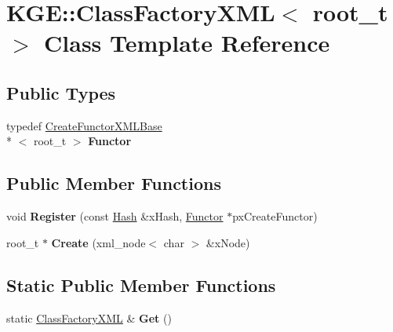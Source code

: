 \hypertarget{class_k_g_e_1_1_class_factory_x_m_l}{\section{K\-G\-E\-:\-:Class\-Factory\-X\-M\-L$<$ root\-\_\-t $>$ Class Template Reference}
\label{class_k_g_e_1_1_class_factory_x_m_l}
}
\subsection*{Public Types}
\begin{DoxyCompactItemize}
\item 
\hypertarget{class_k_g_e_1_1_class_factory_x_m_l_ae739bb8562789f755b760b7a6241c258}{typedef \hyperlink{class_k_g_e_1_1_create_functor_x_m_l_base}{Create\-Functor\-X\-M\-L\-Base}\\*
$<$ root\-\_\-t $>$ {\bfseries Functor}}\label{class_k_g_e_1_1_class_factory_x_m_l_ae739bb8562789f755b760b7a6241c258}

\end{DoxyCompactItemize}
\subsection*{Public Member Functions}
\begin{DoxyCompactItemize}
\item 
\hypertarget{class_k_g_e_1_1_class_factory_x_m_l_a59baec4c0ba02b14e2a2942e238298a8}{void {\bfseries Register} (const \hyperlink{class_k_g_e_1_1_hash}{Hash} \&x\-Hash, \hyperlink{class_k_g_e_1_1_create_functor_x_m_l_base}{Functor} $\ast$px\-Create\-Functor)}\label{class_k_g_e_1_1_class_factory_x_m_l_a59baec4c0ba02b14e2a2942e238298a8}

\item 
\hypertarget{class_k_g_e_1_1_class_factory_x_m_l_a66329c64c8efb1d8c8669b79a70d07dc}{root\-\_\-t $\ast$ {\bfseries Create} (xml\-\_\-node$<$ char $>$ \&x\-Node)}\label{class_k_g_e_1_1_class_factory_x_m_l_a66329c64c8efb1d8c8669b79a70d07dc}

\end{DoxyCompactItemize}
\subsection*{Static Public Member Functions}
\begin{DoxyCompactItemize}
\item 
\hypertarget{class_k_g_e_1_1_class_factory_x_m_l_a625e5a1817369af4e3011da2c70708a8}{static \hyperlink{class_k_g_e_1_1_class_factory_x_m_l}{Class\-Factory\-X\-M\-L} \& {\bfseries Get} ()}\label{class_k_g_e_1_1_class_factory_x_m_l_a625e5a1817369af4e3011da2c70708a8}

\end{DoxyCompactItemize}
